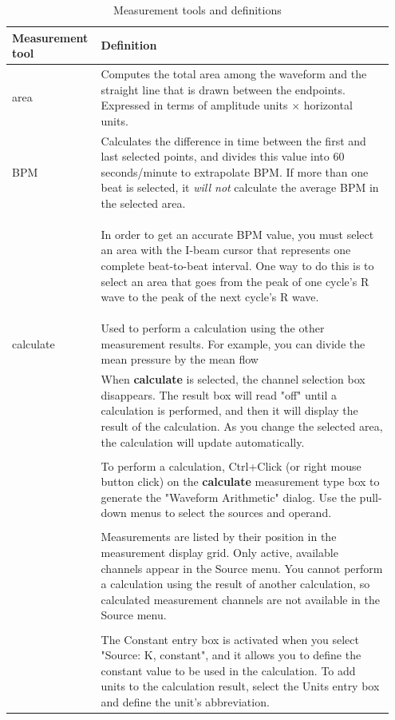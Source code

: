 \documentclass{article}
\begin{document}
\pagebreak
\begin{table}[h!]
	\centering
	\caption{Measurement tools and definitions}
	\label{table_defs}
\begin{tabular}[h!]{p{0.2\linewidth}p{0.75\linewidth}}
\toprule
Measurement tool & Definition\\
\midrule
area & Computes the total area among the waveform and the straight line that is drawn between the endpoints. Expressed in terms of amplitude units $\times$ horizontal units.\\
\midrule
BPM & Calculates the difference in time between the first and last selected points, and divides this value into 60 seconds/minute to extrapolate BPM. If more than one beat is selected, it \textit{will not} calculate the average BPM in the selected area.\\
	& \begin{info}
 	In order to get an accurate BPM value, you must select an area with the I-beam cursor that represents one complete beat-to-beat interval. One way to do this is to select an area that goes from the peak of one cycle's R wave to the peak of the next cycle's R wave.
 	\end{info}\\
\midrule
calculate & Used to perform a calculation using the other measurement results. For example, you can divide the mean pressure by the mean flow\\
	& When \textbf{calculate} is selected, the channel selection box disappears. The result box will read "off" until a calculation is performed, and then it will display the result of the calculation. As you change the selected area, the calculation will update automatically.\\
	& \\
	& To perform a calculation, Ctrl+Click (or right mouse button click) on the \textbf{calculate} measurement type box to generate the "Waveform Arithmetic" dialog. Use the pull-down menus to select the sources and operand.\\
	& \\
	& Measurements are listed by their position in the measurement display grid. Only active, available channels appear in the Source menu. You cannot perform a calculation using the result of another calculation, so calculated measurement channels are not available in the Source menu.\\
	& \\
	& The Constant entry box is activated when you select "Source: K, constant", and it allows you to define the constant value to be used in the calculation. To add units to the calculation result, select the Units entry box and define the unit's abbreviation.\\

\end{tabular}
\end{table}
\end{document}
